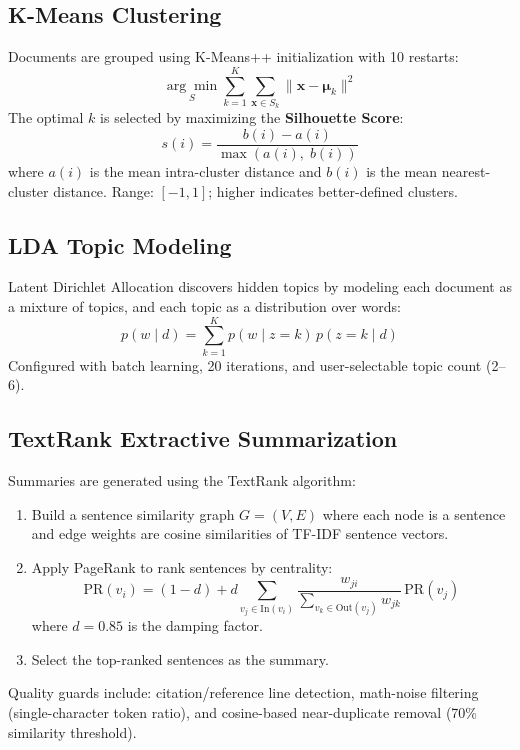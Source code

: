 \documentclass[12pt, a4paper]{article}
\begin{document}
\subsection{K-Means Clustering}
Documents are grouped using K-Means++ initialization with 10 restarts:
\begin{equation}
    \underset{S}{\arg\min} \sum_{k=1}^{K} \sum_{\mathbf{x} \in S_k} \| \mathbf{x} - \boldsymbol{\mu}_k \|^2
\end{equation}
The optimal $k$ is selected by maximizing the \textbf{Silhouette Score}:
\begin{equation}
    s(i) = \frac{b(i) - a(i)}{\max(a(i),\; b(i))}
\end{equation}
where $a(i)$ is the mean intra-cluster distance and $b(i)$ is the mean nearest-cluster distance. Range: $[-1, 1]$; higher indicates better-defined clusters.

\subsection{LDA Topic Modeling}
Latent Dirichlet Allocation discovers hidden topics by modeling each document as a mixture of topics, and each topic as a distribution over words:
\begin{equation}
    p(w \mid d) = \sum_{k=1}^{K} p(w \mid z=k) \, p(z=k \mid d)
\end{equation}
Configured with batch learning, 20 iterations, and user-selectable topic count (2--6).

\subsection{TextRank Extractive Summarization}
Summaries are generated using the TextRank algorithm:
\begin{enumerate}[nosep]
    \item Build a sentence similarity graph $G = (V, E)$ where each node is a sentence and edge weights are cosine similarities of TF-IDF sentence vectors.
    \item Apply PageRank to rank sentences by centrality:
    \begin{equation}
        \text{PR}(v_i) = (1-d) + d \sum_{v_j \in \text{In}(v_i)} \frac{w_{ji}}{\sum_{v_k \in \text{Out}(v_j)} w_{jk}} \, \text{PR}(v_j)
    \end{equation}
    where $d = 0.85$ is the damping factor.
    \item Select the top-ranked sentences as the summary.
\end{enumerate}
Quality guards include: citation/reference line detection, math-noise filtering (single-character token ratio), and cosine-based near-duplicate removal (70\% similarity threshold).
\end{document}
